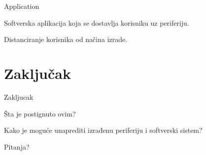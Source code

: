 \documentclass[10pt]{beamer}
\begin{document}
\begin{frame}{Application}
	
	Softverska aplikacija koja se dostavlja korisniku uz periferiju.
	
	\bigskip	
	
	Distanciranje korisnika od načina izrade.
	
\end{frame}


\section{Zaključak}

\begin{frame}{Zakljucak}
	
	Šta je postignuto ovim?
		
	\bigskip		
		
	Kako je moguće unaprediti izrađenu periferiju i softverski sistem?
	
\end{frame}

\begin{frame}[standout]
  Pitanja?
\end{frame}
\end{document}
